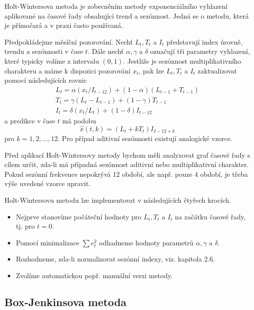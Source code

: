 Holt-Wintersova metoda je zobecněním metody exponenciálního vyhlazení aplikované na časové řady obsahující trend a sezónnost. Jedná se o metodu, která je přímočará a v praxi často používaná.

Předpokládejme měsíční pozorování. Nechť $L_t, T_t$ a $I_t$ představují index úrovně, trendu a sezónnosti v čase $t$. Dále nechť $\alpha, \gamma$ a $\delta$ označují tři parametry vyhlazení, které typicky volíme z intervalu $(0, 1)$. Jestliže je sezónnost multiplikativního charakteru a máme k dispozici pozorování $x_t$, pak lze $L_t, T_t$ a $I_t$ zaktualizovat pomocí následujících rovnic
\begin{equation}
\begin{aligned}
L_t = \alpha(x_t / I_{t - 12}) + (1 - \alpha)(L_{t-1} + T_{t - 1})\\
T_t = \gamma(L_t - L_{t - 1}) + (1 - \gamma) T_{t - 1}\\
I_t = \delta(x_t / L_t) + (1 - \delta) I_{t - 12}
\end{aligned}
\end{equation}
a predikce v čase $t$ má podobu
\begin{equation}
\hat{x}(t, k) = (L_t + k T_t) I_{I - 12 + k}
\end{equation}
pro $k = 1, 2, ..., 12$. Pro případ aditivní sezónnosti existují analogické vzorce.

Před aplikací Holt-Wintersovy metody bychom měli analyzovat graf časové řady s cílem určit, zda-li má případná sezónnost aditivní nebo multiplikativní charakter. Pokud sezónní frekvence nepokrývá 12 období, ale např. pouze 4 období, je třeba výše uvedené vzorce upravit.

Holt-Wintersovu metodu lze implementovat v následujících čtyřech krocích.
\begin{itemize}
\item Nejprve stanovíme počáteční hodnoty pro $L_t, T_t$ a $I_t$ na začátku časové řady, tj. pro $t = 0$.
\item Pomocí minimalizace $\sum e_t^2$ odhadneme hodnoty parametrů $\alpha, \gamma$ a $\delta$.
\item Rozhodneme, zda-li normalizovat sezónní indexy, viz. kapitola 2.6.
\item Zvolíme automatickou popř. manuální verzi metody.
\end{itemize}

\subsection{Box-Jenkinsova metoda}


